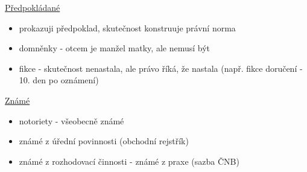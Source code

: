 \underline{Předpokládané} 
\begin{itemize}
    \item prokazuji předpoklad, skutečnost konstruuje právní norma
    \item domněnky - otcem je manžel matky, ale nemusí být
    \item fikce - skutečnost nenastala, ale právo říká, že nastala (např. fikce doručení - 10. den po oznámení) \\
\end{itemize}

\underline{Známé}
\begin{itemize}
    \item notoriety - všeobecně známé
    \item známé z úřední povinnosti (obchodní rejstřík)
    \item známé z rozhodovací činnosti - známé z praxe (sazba ČNB)
\end{itemize}
\clearpage


